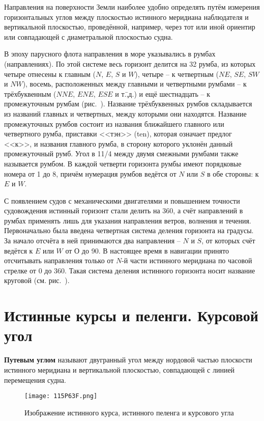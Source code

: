 Направления на поверхности Земли наиболее удобно определять путём
измерения горизонтальных углов между плоскостью истинного меридиана
наблюдателя и вертикальной плоскостью, проведённой, например, через
тот или иной ориентир или совпадающей с диаметральной плоскостью
судна.

В эпоху парусного флота направления в море указывались в румбах
(направлениях). По этой системе весь горизонт делится на 32 румба, из
которых четыре отнесены к главным ($N$, $E$, $S$ и $W$), четыре \--- к
четвертным ($NE$, $SE$, $SW$ и $NW$), восемь, расположенных между
главными и четвертными румбами \--- к трёхбуквенным ($NNE$, $ENE$,
$ESE$ и т.\=,д.) и ещё шестнадцать \--- к промежуточным румбам
(рис.~). Название трёхбуквенных румбов складывается из
названий главных и четвертных, между которыми они находятся. Название
промежуточных румбов состоит из названия ближайшего главного или
четвертного румба, приставки <<тэн>> (ten), которая означает предлог
<<к>>, и названия главного румба, в сторону которого уклонён данный
промежуточный румб. Угол в 11/4 между двумя смежными румбами
также называется румбом. В каждой четверти горизонта румбы имеют
порядковые номера от 1 до 8, причём нумерация румбов ведётся от $N$
или $S$ в обе стороны: к $E$ и $W$.

С появлением судов с механическими двигателями и повышением точности
судовождения истинный горизонт стали делить на 360\gr, а счёт
направлений в румбах применять лишь для указания направления ветров,
волнения и течения. Первоначально была введена четвертная система
деления горизонта на градусы. За начало отсчёта в ней принимаются два
направления \--- $N$ и $S$, от которых счёт ведётся к $E$ или $W$ от О
до 90\gr. В настоящее время в навигации принято отсчитывать
направления только от $N$-й части истинного меридиана по часовой
стрелке от 0 до 360\gr. Такая система деления истинного горизонта
носит название круговой (см. рис.~).

\section{Истинные курсы и пеленги. Курсовой угол} 

\textbf{Путевым углом} называют двугранный угол
между нордовой частью плоскости истинного меридиана и вертикальной
плоскостью, совпадающей с линией перемещения судна.

\begin{figure}[htb]
  \centering{}
  \texttt{[image: 115P63F.png]} %
  \caption{Изображение истинного курса, истинного пеленга и курсового угла}
  \label{fig:N8}
\end{figure}

